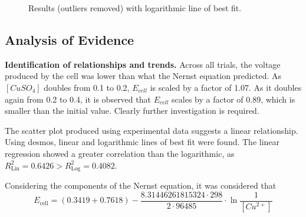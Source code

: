 \documentclass[11pt,a4paper]{article}
\begin{document}
\begin{figure}[h]
	\centering
	\caption{Results (outliers removed) with logarithmic line of best fit.}
\end{figure}


\subsection{Analysis of Evidence}
\textbf{Identification of relationships and trends.}\newline
Across all trials, the voltage produced by the cell was lower than what the Nernst equation predicted. As $[CuSO_4]$ doubles from 0.1 to 0.2, $E_{cell}$ is scaled by a factor of 1.07. As it doubles again from 0.2 to 0.4,  it is observed that $E_{cell}$ scales by a factor of $0.89$, which is smaller than the initial value. Clearly further investigation is required.


The scatter plot produced using experimental data suggests a linear relationship. Using desmos, linear and logarithmic lines of best fit were found. The linear regression showed a greater correlation than the logarithmic, as $R^2_\textrm{Lin}=0.6426>R^2_\textrm{Log}=0.4082$.


Considering the components of the Nernst equation, it was considered that 
 $$E_{\textrm{cell}}=(0.3419+0.7618)-\frac{8.31446261815324\cdot298}{2\cdot96485}\cdot\ln\frac{1}{[Cu^{2+}]}$$
\end{document}
